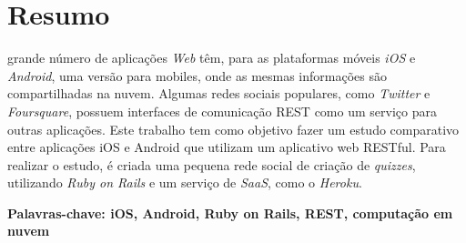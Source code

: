 \chapter*{Resumo}
\label{chp:resumo}%
\thispagestyle{empty}

\setcounter{footnote}{0}

 grande número de aplicações \emph{Web} têm, para as plataformas móveis \emph{iOS} e \emph{Android}, uma versão para mobiles, onde as mesmas informações são compartilhadas na nuvem. Algumas redes sociais populares, como \emph{Twitter} e \emph{Foursquare}, possuem interfaces de comunicação REST como um serviço para outras aplicações. Este trabalho tem como objetivo fazer um estudo comparativo entre aplicações iOS e Android que utilizam um aplicativo web RESTful. Para realizar o estudo, é criada uma pequena rede social de criação de \emph{quizzes}, utilizando \emph{Ruby on Rails} e um serviço de \emph{SaaS}, como o \emph{Heroku}.



\noindent \textbf{Palavras-chave: iOS, Android, Ruby on Rails, REST, computação em nuvem}
